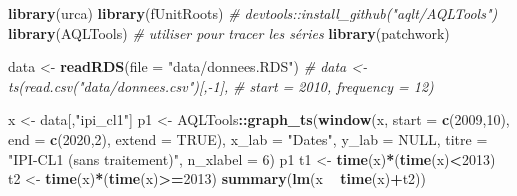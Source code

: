 \documentclass[french]{article}
\newenvironment{Shaded}{\begin{snugshade}}{\end{snugshade}}
\newcommand{\CommentTok}[1]{\textcolor[rgb]{0.56,0.35,0.01}{\textit{#1}}}
\newcommand{\DataTypeTok}[1]{\textcolor[rgb]{0.13,0.29,0.53}{#1}}
\newcommand{\DecValTok}[1]{\textcolor[rgb]{0.00,0.00,0.81}{#1}}
\newcommand{\KeywordTok}[1]{\textcolor[rgb]{0.13,0.29,0.53}{\textbf{#1}}}
\newcommand{\NormalTok}[1]{#1}
\newcommand{\OperatorTok}[1]{\textcolor[rgb]{0.81,0.36,0.00}{\textbf{#1}}}
\newcommand{\OtherTok}[1]{\textcolor[rgb]{0.56,0.35,0.01}{#1}}
\newcommand{\StringTok}[1]{\textcolor[rgb]{0.31,0.60,0.02}{#1}}
\begin{document}
\begin{Shaded}
\begin{Highlighting}[]
\KeywordTok{library}\NormalTok{(urca)}
\KeywordTok{library}\NormalTok{(fUnitRoots)}
\CommentTok{# devtools::install_github("aqlt/AQLTools")}
\KeywordTok{library}\NormalTok{(AQLTools) }\CommentTok{# utiliser pour tracer les séries}
\KeywordTok{library}\NormalTok{(patchwork)}

\NormalTok{data <-}\StringTok{ }\KeywordTok{readRDS}\NormalTok{(}\DataTypeTok{file =} \StringTok{"data/donnees.RDS"}\NormalTok{)}
\CommentTok{# data <- ts(read.csv("data/donnees.csv")[,-1],}
\CommentTok{#          start = 2010, frequency = 12)}


\NormalTok{x <-}\StringTok{ }\NormalTok{data[,}\StringTok{"ipi_cl1"}\NormalTok{]}
\NormalTok{p1 <-}\StringTok{ }\NormalTok{AQLTools}\OperatorTok{::}\KeywordTok{graph_ts}\NormalTok{(}\KeywordTok{window}\NormalTok{(x,}
                                \DataTypeTok{start =} \KeywordTok{c}\NormalTok{(}\DecValTok{2009}\NormalTok{,}\DecValTok{10}\NormalTok{),}
                                \DataTypeTok{end =} \KeywordTok{c}\NormalTok{(}\DecValTok{2020}\NormalTok{,}\DecValTok{2}\NormalTok{),}
                                \DataTypeTok{extend =} \OtherTok{TRUE}\NormalTok{), }\DataTypeTok{x_lab =} \StringTok{"Dates"}\NormalTok{, }\DataTypeTok{y_lab =} \OtherTok{NULL}\NormalTok{,}
                         \DataTypeTok{titre =} \StringTok{"IPI-CL1 (sans traitement)"}\NormalTok{, }\DataTypeTok{n_xlabel =} \DecValTok{6}\NormalTok{)}
\NormalTok{p1}
\NormalTok{t1 <-}\StringTok{ }\KeywordTok{time}\NormalTok{(x)}\OperatorTok{*}\NormalTok{(}\KeywordTok{time}\NormalTok{(x)}\OperatorTok{<}\DecValTok{2013}\NormalTok{)}
\NormalTok{t2 <-}\StringTok{ }\KeywordTok{time}\NormalTok{(x)}\OperatorTok{*}\NormalTok{(}\KeywordTok{time}\NormalTok{(x)}\OperatorTok{>=}\DecValTok{2013}\NormalTok{)}
\KeywordTok{summary}\NormalTok{(}\KeywordTok{lm}\NormalTok{(x }\OperatorTok{~}\StringTok{ }\KeywordTok{time}\NormalTok{(x)}\OperatorTok{+}\NormalTok{t2))}


\end{Highlighting}
\end{Shaded}
\end{document}
